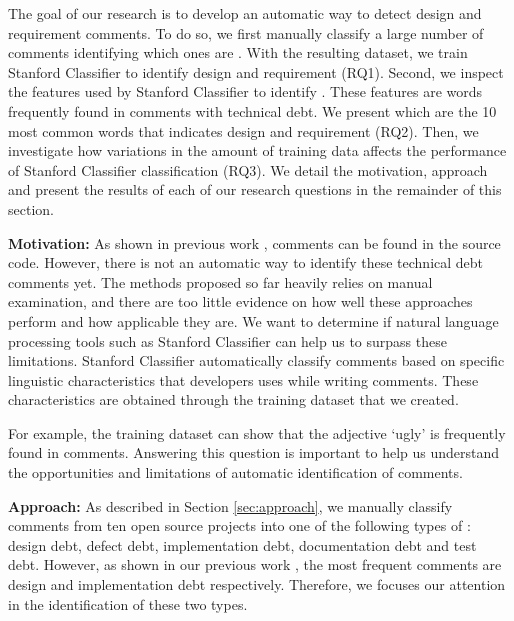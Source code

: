 The goal of our research is to develop an automatic way to detect design and requirement \SATD comments. To do so, we first manually classify a large number of comments identifying which ones are \SATD. With the resulting dataset, we train Stanford Classifier to identify design and requirement \SATD (RQ1). Second, we inspect the features used by Stanford Classifier to identify \SATD. These features are words frequently found in comments with technical debt. We present which are the 10 most common words that indicates design and requirement \SATD (RQ2). Then, we investigate how variations in the amount of training data affects the performance of Stanford Classifier classification (RQ3). We detail the motivation, approach and present the results of each of our research questions in the remainder of this section.    

\vspace{3mm}
\noindent\rqi
\vspace{3mm}

\noindent \textbf{Motivation:} As shown in previous work \cite{Potdar2014ICSME, Maldonado2015MTD}, \SATD comments can be found in the source code. However, there is not an automatic way to identify these technical debt comments yet. The methods proposed so far heavily relies on manual examination, and there are too little evidence on how well these approaches perform and how applicable they are. We want to determine if natural language processing tools such as Stanford Classifier can help us to surpass these limitations. Stanford Classifier automatically classify comments based on specific linguistic characteristics that developers uses while writing comments. These characteristics are obtained through the training dataset that we created. 

For example, the training dataset can show that the adjective `ugly' is frequently found in \SATD comments. Answering this question is important to help us understand the opportunities and limitations of automatic identification of \SATD comments. 

\vspace{1mm}
\noindent \textbf{Approach:} As described in Section \ref{sec:approach}, we manually classify comments from ten open source projects into one of the following types of \SATD: design debt, defect debt, implementation debt, documentation debt and test debt. However, as shown in our previous work \cite{Maldonado2015MTD}, the most frequent \SATD comments are design and implementation debt respectively. Therefore, we focuses our attention in the identification of these two \SATD types. 

